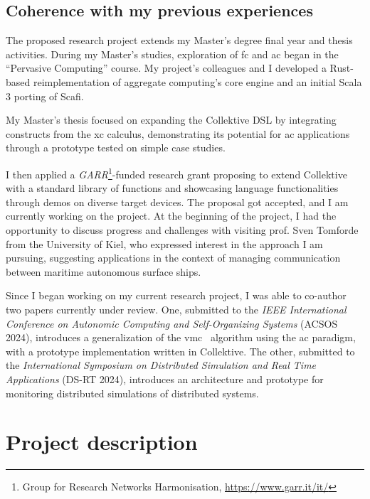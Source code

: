 \documentclass[12pt, a4paper]{article}
\begin{document}
\subsection{Coherence with my previous experiences}
\label{subsec:coherence-with-the-educational-path}
The proposed research project extends my Master’s degree final year and thesis activities.
%
During my Master’s studies, exploration of  \ac{fc} and \ac{ac} began in the “Pervasive Computing” course.
%
My project's colleagues and I developed a Rust-based reimplementation of aggregate computing's core engine
and an initial Scala 3 porting of Scafi.

My Master’s thesis focused on expanding the Collektive DSL by integrating constructs from the \ac{xc} calculus,
demonstrating its potential for \ac{ac} applications through a prototype tested on simple case studies.

I then applied a \emph{GARR}\footnote{Group for Research Networks Harmonisation, \url{https://www.garr.it/it/}}-funded research grant
proposing to extend Collektive with a standard library of functions
and showcasing language functionalities through demos on diverse target devices.
%
The proposal got accepted, and I am currently working on the project.
%
At the beginning of the project,
I had the opportunity to discuss progress and challenges with visiting prof. Sven Tomforde from
the University of Kiel,
who expressed interest in the approach I am pursuing,
suggesting applications in the context of
managing communication between maritime autonomous surface ships.

Since I began working on my current research project,
I was able to co-author two papers currently under review.
%
One, submitted to the \emph{IEEE International Conference on Autonomic Computing and Self-Organizing Systems} (ACSOS 2024),
introduces a generalization of the \ac{vmc}~\cite{ZahadatHS17} algorithm using the \ac{ac} paradigm,
with a prototype implementation written in Collektive.
%
The other, submitted to the \emph{International Symposium on Distributed Simulation and Real Time Applications} (DS-RT 2024),
introduces an architecture and prototype for monitoring distributed simulations of distributed systems.

\section{Project description}
\label{sec:project-description}

\end{document}
